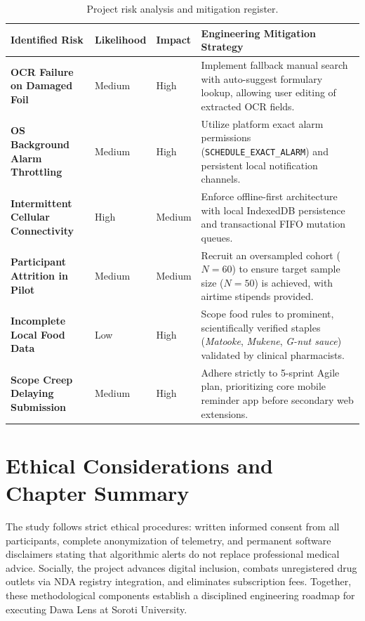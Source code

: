 \begin{table}[!htbp]
  \centering
  \caption{Project risk analysis and mitigation register.}
  \label{tab:risks}
  \footnotesize
  \setlength{\tabcolsep}{3.5pt}
  \begin{tabularx}{\textwidth}{@{} >{\raggedright\arraybackslash}p{2.8cm} >{\centering\arraybackslash}p{1.4cm} >{\centering\arraybackslash}p{1.3cm} >{\raggedright\arraybackslash}X @{}}
    \toprule
    \textbf{Identified Risk} & \textbf{Likelihood} & \textbf{Impact} & \textbf{Engineering Mitigation Strategy} \\
    \midrule
    \textbf{OCR Failure on Damaged Foil} & Medium & High & Implement fallback manual search with auto-suggest formulary lookup, allowing user editing of extracted OCR fields. \\
    \midrule
    \textbf{OS Background Alarm Throttling} & Medium & High & Utilize platform exact alarm permissions (\texttt{SCHEDULE\_EXACT\_ALARM}) and persistent local notification channels. \\
    \midrule
    \textbf{Intermittent Cellular Connectivity} & High & Medium & Enforce offline-first architecture with local IndexedDB persistence and transactional FIFO mutation queues. \\
    \midrule
    \textbf{Participant Attrition in Pilot} & Medium & Medium & Recruit an oversampled cohort ($N=60$) to ensure target sample size ($N=50$) is achieved, with airtime stipends provided. \\
    \midrule
    \textbf{Incomplete Local Food Data} & Low & High & Scope food rules to prominent, scientifically verified staples (\textit{Matooke}, \textit{Mukene}, \textit{G-nut sauce}) validated by clinical pharmacists. \\
    \midrule
    \textbf{Scope Creep Delaying Submission} & Medium & High & Adhere strictly to 5-sprint Agile plan, prioritizing core mobile reminder app before secondary web extensions. \\
    \bottomrule
  \end{tabularx}
\end{table}

\section{Ethical Considerations and Chapter Summary}

The study follows strict ethical procedures: written informed consent from all participants, complete anonymization of telemetry, and permanent software disclaimers stating that algorithmic alerts do not replace professional medical advice. Socially, the project advances digital inclusion, combats unregistered drug outlets via NDA registry integration, and eliminates subscription fees. Together, these methodological components establish a disciplined engineering roadmap for executing Dawa Lens at Soroti University.
